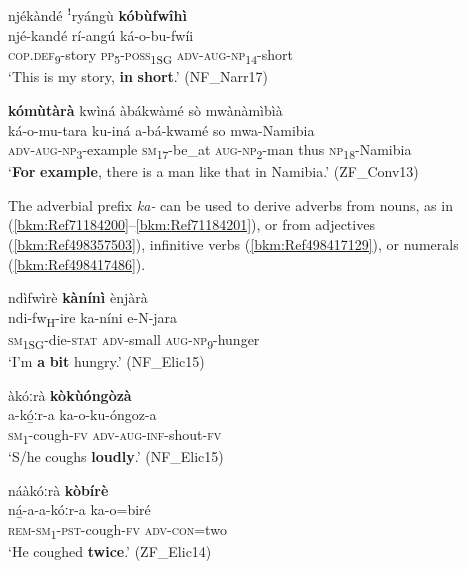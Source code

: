 \ea
\label{bkm:Ref71184200}
njékàndé ꜝryángù \textbf{kóbùfwîhì}\\
\gll njé-kandé    rí-angú  ká-o-bu-fwíi\\
\textsc{cop}.\textsc{def}\textsubscript{9}-story  \textsc{pp}\textsubscript{5}-\textsc{poss}\textsubscript{1SG}  \textsc{adv}-\textsc{aug}-\textsc{np}\textsubscript{14}-short\\
\glt ‘This is my story, \textbf{in} \textbf{short}.’ (NF\_Narr17)
\z

\ea
\label{bkm:Ref71184201}
\textbf{kómùtàrà} kwìná àbákwàmé sò mwànàmìbìà\\
\gll ká-o-mu-tara    ku-iná    a-bá-kwamé    so mwa-Namibia \\
\textsc{adv}-\textsc{aug}-\textsc{np}\textsubscript{3}-example  \textsc{sm}\textsubscript{17}-be\_at  \textsc{aug}-\textsc{np}\textsubscript{2}-man  thus
\textsc{np}\textsubscript{18}-Namibia\\
\glt ‘\textbf{For} \textbf{example}, there is a man like that in Namibia.’ (ZF\_Conv13)
\z

The adverbial prefix \textit{ka-} can be used to derive adverbs from nouns, as in (\ref{bkm:Ref71184200}--\ref{bkm:Ref71184201}), or from adjectives (\ref{bkm:Ref498357503}), infinitive verbs (\ref{bkm:Ref498417129}), or numerals (\ref{bkm:Ref498417486}).

\ea
\label{bkm:Ref498357503}
ndìfwìrè \textbf{kànínì} ènjàrà\\
\gll ndi-fw\textsubscript{H}-ire    ka-níni  e-N-jara\\
\textsc{sm}\textsubscript{1SG}-die-\textsc{stat}  \textsc{adv}-small  \textsc{aug}-\textsc{np}\textsubscript{9}-hunger\\
\glt ‘I’m \textbf{a} \textbf{bit} hungry.’ (NF\_Elic15)
\z

\ea
\label{bkm:Ref498417129}
àkóːrà \textbf{kòkùóngòzà}\\
\gll a-kó̲ːr-a    ka-o-ku-óngoz-a\\
\textsc{sm}\textsubscript{1}-cough-\textsc{fv}  \textsc{adv}-\textsc{aug}-\textsc{inf}-shout-\textsc{fv}\\
\glt ‘S/he coughs \textbf{loudly}.’ (NF\_Elic15)
\z

\ea
\label{bkm:Ref498417486}
náàkóːrà \textbf{kòbírè}\\
\gll ná̲-a-a-kóːr-a    ka-o=biré\\
\textsc{rem}-\textsc{sm}\textsubscript{1}-\textsc{pst}-cough-\textsc{fv}  \textsc{adv}-\textsc{con}=two\\
\glt ‘He coughed \textbf{twice}.’ (ZF\_Elic14)
\z

